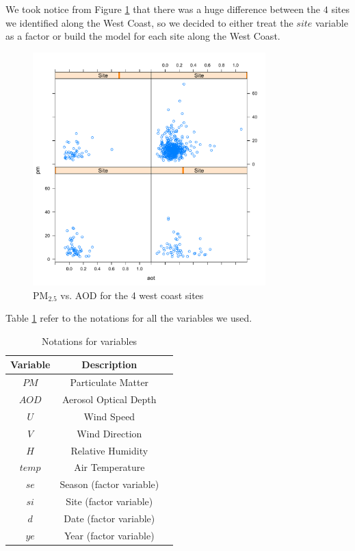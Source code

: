 \documentclass[10pt]{article}
\begin{document}
We took notice from Figure \ref{fig:pm_vs_aod_four_west} that there was a huge difference between the $4$ sites we identified along the West Coast, so we decided to either treat the $site$ variable as a factor or build the model for each site along the West Coast. 

\begin{figure}[!h]
\centering
\includegraphics[width = 90mm]{3.pdf}
\caption{PM$_{2.5}$ vs. AOD for the 4 west coast sites}
\label{fig:pm_vs_aod_four_west}
\end{figure}

Table \ref{variable} refer to the  notations for all the variables we used. 

\begin{table}[H] 
\centering
\begin{tabular}{|c|c|c|}
\hline
Variable & Description \\ 
\hline
$PM$ & Particulate Matter \\
$AOD$ & Aerosol Optical Depth \\
$U$ & Wind Speed \\
$V$ & Wind Direction \\
$H$ & Relative Humidity \\
$temp$ & Air Temperature \\
$se$ & Season (factor variable)\\
$si$ & Site (factor variable)\\
$d$ & Date (factor variable)\\
$ye$ & Year (factor variable)\\
\hline
\end{tabular}
\caption{Notations for variables}
\label{variable}
\end{table}
\end{document}

